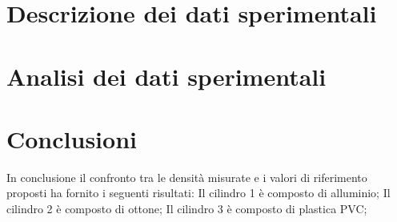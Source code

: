 \documentclass[11pt]{article}
\begin{document}
\section{Descrizione dei dati sperimentali}

\section{Analisi dei dati sperimentali}

\section{Conclusioni}
In conclusione il confronto tra le densità misurate e i valori di riferimento proposti ha fornito i seguenti risultati: 
Il cilindro 1 è composto di alluminio;
Il cilindro 2 è composto di ottone;
Il cilindro 3 è composto di plastica PVC;
\end{document}
